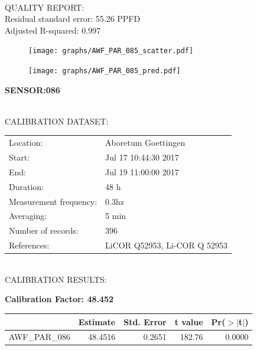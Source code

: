 \documentclass[oneside]{report}
\begin{document}
\hrulefill\\
QUALITY REPORT:\\
Residual standard error: 55.26 PPFD\\
Adjusted R-squared: 0.997



\begin{figure}[H]
  \centering
  \texttt{[image: graphs/AWF\_PAR\_085\_scatter.pdf]}
\end{figure}




\begin{figure}[H]
  \centering
  \texttt{[image: graphs/AWF\_PAR\_085\_pred.pdf]}
\end{figure}

\pagebreak


\begin{center}
\large{\textbf{SENSOR:086}}\\
\end{center}

\hrulefill\\
CALIBRATION DATASET:\\
\begin{table}[h!]
  \centering
  \label{tab:table1}
  \begin{tabular}{ll}
    Location: & Aboretum Goettingen\\ 
    
    
    Start:  & Jul 17 10:44:30 2017 \\
    End:   & Jul 19 11:00:00 2017\\ 
    Duration: & 48 h\\
    Measurement frequency: & 0.3hz\\
    Averaging:  &5 min\\
    Number of records: & 396 \\
    References: & LiCOR Q52953, Li-COR Q 52953 \\
  \end{tabular}
\end{table}

\hrulefill\\
CALIBRATION RESULTS:\\


\begin{center}
\textbf{\large{Calibration Factor: 48.452}}\\
\end{center}
\begin{table}[ht]
\centering
\begin{tabular}{rrrrr}
  \hline
 & Estimate & Std. Error & t value & Pr($>$$|$t$|$) \\ 
  \hline
AWF\_PAR\_086 & 48.4516 & 0.2651 & 182.76 & 0.0000 \\ 
   \hline
\end{tabular}
\end{table}
\end{document}
